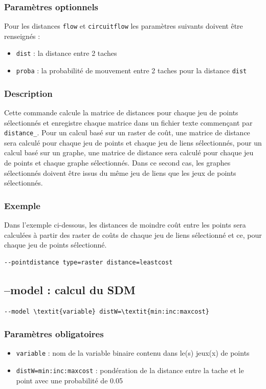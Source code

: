 \documentclass[a4paper,10pt]{report}
\begin{document}
\subsubsection{Paramètres optionnels}
Pour les distances \verb|flow| et \verb|circuitflow| les paramètres suivants doivent être renseignés :
\begin{itemize}
	\item \verb|dist| : la distance entre 2 taches
	\item \verb|proba| : la probabilité de mouvement entre 2 taches pour la distance \verb|dist|
\end{itemize}

\subsubsection{Description}
Cette commande calcule la matrice de distances pour chaque jeu de points sélectionnés et enregistre chaque matrice dans un fichier texte commençant par \verb|distance_|.
Pour un calcul basé sur un raster de coût, une matrice de distance sera calculé pour chaque jeu de points et chaque jeu de liens sélectionnés, pour un calcul basé sur un graphe, une matrice de distance sera calculé pour chaque jeu de points et chaque graphe sélectionnés. Dans ce second cas, les graphes sélectionnés doivent être issus du même jeu de liens que les jeux de points sélectionnés.

\subsubsection{Exemple}
Dans l'exemple ci-dessous, les distances de moindre coût entre les points sera calculées à partir des raster de coûts de chaque jeu de liens sélectionné et ce, pour chaque jeu de points sélectionné.
\begin{Verbatim}
--pointdistance type=raster distance=leastcost
\end{Verbatim}

\subsection{--model : calcul du SDM}
\begin{Verbatim}[commandchars=\\\{\}]
--model \textit{variable} distW=\textit{min:inc:maxcost}
\end{Verbatim}

\subsubsection{Paramètres obligatoires}
\begin{itemize}
	\item \verb|variable| : nom de la variable binaire contenu dans le(s) jeux(x) de points
	\item \verb|distW=min:inc:maxcost| : pondération de la distance entre la tache et le point avec une probabilité de 0.05	
\end{itemize}
\end{document}

